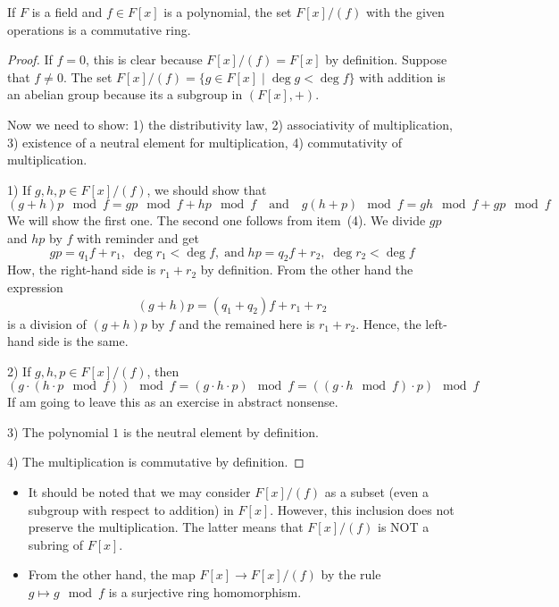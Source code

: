 \begin{claim}
If $F$ is a field and $f\in F[x]$ is a polynomial, the set  $F[x]/(f)$ with the given operations is a commutative ring.
\end{claim}
\begin{proof}
If $f = 0$, this is clear because $F[x]/(f) = F[x]$ by definition.
Suppose that $f \neq 0$.
The set $F[x]/(f) = \{g\in F[x]\mid \deg g < \deg f\}$ with addition is an abelian group because its a subgroup in $(F[x], +)$.

Now we need to show: 1) the distributivity law, 2) associativity of multiplication, 3) existence of a neutral element for multiplication, 4) commutativity of multiplication.

1) If $g,h,p\in F[x]/(f)$, we should show that
\[
(g+h)p\!\!\mod{f} = gp\!\!\mod{f} + hp\!\!\mod{f}\quad\text{and}\quad
g(h+p)\!\!\mod{f} = gh\!\!\mod{f} + gp\!\!\mod{f}
\]
We will show the first one.
The second one follows from item~(4).
We divide $gp$ and $hp$ by $f$ with reminder and get
\[
gp = q_1 f + r_1,\;\deg r_1 < \deg f,\;\text{and}\;hp = q_2 f + r_2,\;\deg r_2 < \deg f
\]
How, the right-hand side is $r_1 + r_2$ by definition.
From the other hand the expression
\[
(g+h)p = (q_1 + q_2)f + r_1 + r_2
\]
is a division of $(g+h)p$ by $f$ and the remained here is $r_1 + r_2$.
Hence, the left-hand side is the same.

2) If $g,h,p\in F[x]/(f)$, then 
\[
(g\cdot  (h\cdot  p\!\!\mod{f}))\!\!\mod{f}= (g\cdot  h\cdot  p)\!\!\mod{f} = ((g \cdot h\!\!\mod{f}) \cdot p)\!\!\mod{f}
\]
If am going to leave this as an exercise in abstract nonsense.

3) The polynomial $1$ is the neutral element by definition.

4) The multiplication is commutative by definition.

\end{proof}

\begin{remarks}
\begin{itemize}
\item It should be noted that we may consider $F[x]/(f)$ as a subset (even a subgroup with respect to addition) in $F[x]$.
However, this inclusion does not preserve the multiplication.
The latter means that $F[x]/(f)$ is NOT a subring of $F[x]$.

\item From the other hand, the map $F[x]\to F[x]/(f)$ by the rule $g\mapsto g\!\!\mod{f}$ is a surjective ring homomorphism.
\end{itemize}
\end{remarks}

